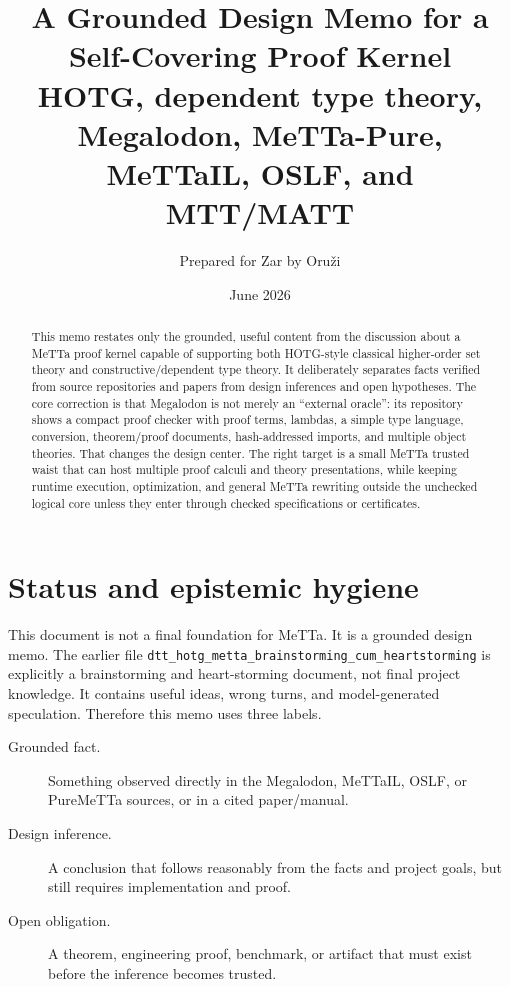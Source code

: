 \documentclass[11pt]{article}
\title{A Grounded Design Memo for a Self-Covering \MeTTa{} Proof Kernel\\
\large HOTG, dependent type theory, Megalodon, MeTTa-Pure, MeTTaIL, OSLF, and MTT/MATT}
\author{Prepared for Zar by Oru\v{z}i}
\date{June 2026}
\newcommand{\MeTTa}{\textup{MeTTa}}
\newcommand{\MeTTaIL}{\textup{MeTTaIL}}
\newcommand{\Megalodon}{\textup{Megalodon}}
\newcommand{\HOTG}{\textup{HOTG}}
\newcommand{\OSLF}{\textup{OSLF}}
\newcommand{\PureMeTTa}{\textup{PureMeTTa}}
\newcommand{\code}[1]{\texttt{#1}}
\begin{document}
\maketitle

\begin{abstract}
This memo restates only the grounded, useful content from the discussion about a \MeTTa{} proof kernel capable of supporting both \HOTG{}-style classical higher-order set theory and constructive/dependent type theory.  It deliberately separates facts verified from source repositories and papers from design inferences and open hypotheses.  The core correction is that \Megalodon{} is not merely an ``external oracle'': its repository shows a compact proof checker with proof terms, lambdas, a simple type language, conversion, theorem/proof documents, hash-addressed imports, and multiple object theories.  That changes the design center.  The right target is a small \MeTTa{} trusted waist that can host multiple proof calculi and theory presentations, while keeping runtime execution, optimization, and general \MeTTa{} rewriting outside the unchecked logical core unless they enter through checked specifications or certificates.
\end{abstract}

\tableofcontents

\section{Status and epistemic hygiene}

This document is not a final foundation for \MeTTa{}.  It is a grounded design memo.
The earlier file \code{dtt\_hotg\_metta\_brainstorming\_cum\_heartstorming} is explicitly a brainstorming and heart-storming document, not final project knowledge.  It contains useful ideas, wrong turns, and model-generated speculation.  Therefore this memo uses three labels.

\begin{description}
\item[Grounded fact.] Something observed directly in the \Megalodon{}, \MeTTaIL{}, \OSLF{}, or \PureMeTTa{} sources, or in a cited paper/manual.
\item[Design inference.] A conclusion that follows reasonably from the facts and project goals, but still requires implementation and proof.
\item[Open obligation.] A theorem, engineering proof, benchmark, or artifact that must exist before the inference becomes trusted.
\end{description}
\end{document}
